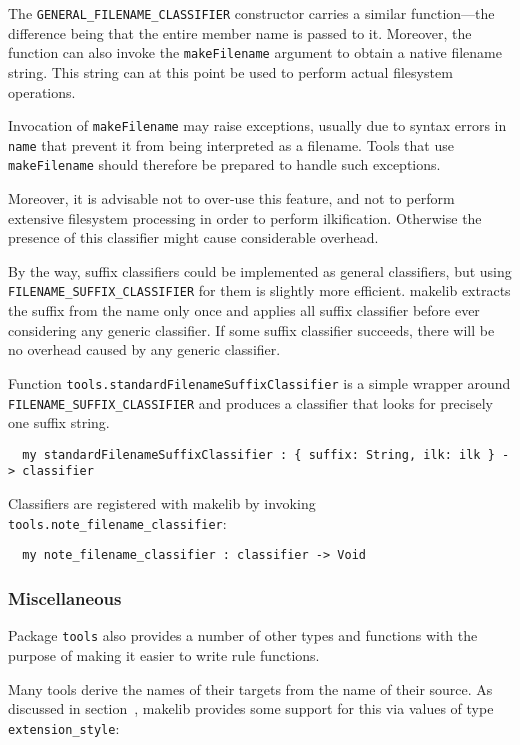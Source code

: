 The {\tt GENERAL\_FILENAME\_CLASSIFIER} constructor carries a similar function---the
difference being that the entire member name is passed to it.
Moreover, the function can also invoke the {\tt makeFilename} argument to
obtain a native filename string.  This string can at this point be
used to perform actual filesystem operations.

Invocation of {\tt makeFilename} may raise exceptions, usually due to
syntax errors in {\tt name} that prevent it from being interpreted as
a filename.  Tools that use {\tt makeFilename} should therefore be prepared
to handle such exceptions.

Moreover, it is advisable not to over-use this feature, and not to
perform extensive filesystem processing in order to perform
ilkification.  Otherwise the presence of this classifier might cause
considerable overhead.

By the way, suffix classifiers could be implemented as general
classifiers, but using {\tt FILENAME\_SUFFIX\_CLASSIFIER} for them is slightly more
efficient.  makelib extracts the suffix from the name only once and applies
all suffix classifier before ever considering any generic classifier.
If some suffix classifier succeeds, there will be no overhead caused
by any generic classifier.

Function {\tt tools.standardFilenameSuffixClassifier} is a simple wrapper around {\tt
FILENAME\_SUFFIX\_CLASSIFIER} and produces a classifier that looks for precisely
one suffix string.

\begin{verbatim}
  my standardFilenameSuffixClassifier : { suffix: String, ilk: ilk } -> classifier
\end{verbatim}

Classifiers are registered with makelib by invoking {\tt
tools.note_filename_classifier}:

\begin{verbatim}
  my note_filename_classifier : classifier -> Void
\end{verbatim}

\subsubsection{Miscellaneous}

Package {\tt tools} also provides a number of other types and
functions with the purpose of making it easier to write rule
functions.

 Many tools derive the names of
their targets from the name of their source.  As discussed in
section~, makelib provides some support for this via
values of type {\tt extension_style}:

